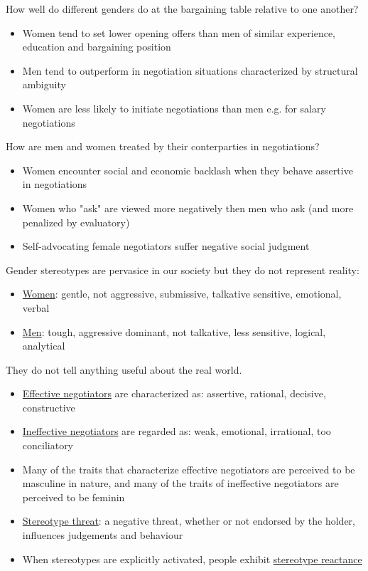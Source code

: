How well do different genders do at the bargaining table relative to one
another?
\begin{itemize}
    \item Women tend to set lower opening offers than men of similar
        experience, education and bargaining position
    \item Men tend to outperform in negotiation situations characterized
        by structural ambiguity
    \item Women are less likely to initiate negotiations than men e.g. for
        salary negotiations
\end{itemize}
How are men and women treated by their conterparties in negotiations?
\begin{itemize}
    \item Women encounter social and economic backlash when they behave
        assertive in negotiations
    \item Women who "ask" are viewed more negatively then men who ask (and
        more penalized by evaluatory)
    \item Self-advocating female negotiators suffer negative social judgment
\end{itemize}
Gender stereotypes are pervasice in our society but they do not represent reality:
\begin{itemize}
    \item \underline{Women}: gentle, not aggressive, submissive, talkative
        sensitive, emotional, verbal
    \item \underline{Men}: tough, aggressive dominant, not talkative, less
        sensitive, logical, analytical
\end{itemize}
They do not tell anything useful about the real world.
\begin{itemize}
    \item \underline{Effective negotiators} are characterized as: assertive, rational,
        decisive, constructive
    \item \underline{Ineffective negotiators} are regarded as: weak, emotional,
        irrational, too conciliatory
    \item Many of the traits that characterize effective negotiators are
        perceived to be masculine in nature, and many of the traits of
        ineffective negotiators are perceived to be feminin
    \item \underline{Stereotype threat}: a negative threat, whether or not
        endorsed by the holder, influences judgements and behaviour
    \item When stereotypes are explicitly activated, people exhibit
        \underline{stereotype reactance}
\end{itemize}

